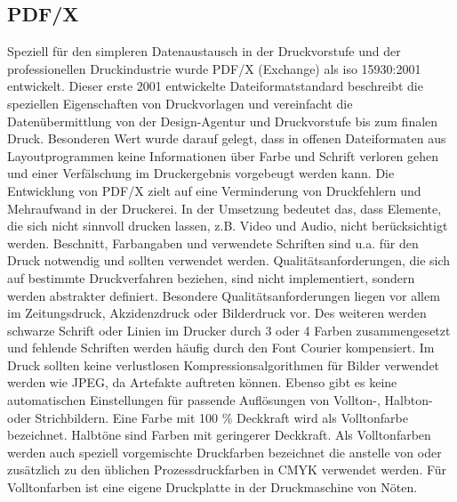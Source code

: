 \subsection{PDF/X}
Speziell für den simpleren Datenaustausch in der Druckvorstufe und der professionellen Druckindustrie wurde PDF/X (Exchange) als \gls{iso} 15930:2001 entwickelt. Dieser erste 2001 entwickelte Dateiformatstandard beschreibt die speziellen Eigenschaften von Druckvorlagen und vereinfacht die Datenübermittlung von der Design-Agentur und Druckvorstufe bis zum finalen Druck. Besonderen Wert wurde darauf gelegt, dass in offenen Dateiformaten aus Layoutprogrammen keine Informationen über Farbe und Schrift verloren gehen und einer Verfälschung im Druckergebnis vorgebeugt werden kann. \cite{adobe-pdf-e} Die Entwicklung von PDF/X zielt auf eine Verminderung von Druckfehlern und Mehraufwand in der Druckerei. In der Umsetzung bedeutet das, dass Elemente, die sich nicht sinnvoll drucken lassen, z.B. Video und Audio, nicht berücksichtigt werden. Beschnitt, Farbangaben und verwendete Schriften sind u.a. für den Druck notwendig und sollten verwendet werden. Qualitätsanforderungen, die sich auf bestimmte Druckverfahren beziehen, sind nicht implementiert, sondern werden abstrakter definiert. Besondere Qualitätsanforderungen liegen vor allem im Zeitungsdruck, Akzidenzdruck oder Bilderdruck vor. Des weiteren werden schwarze Schrift oder Linien im Drucker durch 3 oder 4 Farben zusammengesetzt und fehlende Schriften werden häufig durch den Font Courier kompensiert. Im Druck sollten keine verlustlosen Kompressionsalgorithmen für Bilder verwendet werden wie JPEG, da Artefakte auftreten können. Ebenso gibt es keine automatischen Einstellungen für passende Auflösungen von Vollton-, Halbton- oder Strichbildern. \cite{adobe-pdf-x} Eine Farbe mit 100 \% Deckkraft wird als Volltonfarbe bezeichnet. Halbtöne sind Farben mit geringerer Deckkraft. \cite{halb-voll} Als Volltonfarben werden auch speziell vorgemischte Druckfarben bezeichnet die anstelle von oder zusätzlich zu den üblichen Prozessdruckfarben in CMYK verwendet werden. Für Volltonfarben ist eine eigene Druckplatte in der Druckmaschine von Nöten. \cite{adobe-voll}
